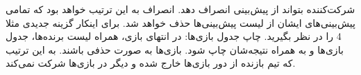 \documentclass[../main.tex]{subfiles}
\begin{document}

     شرکت‌کننده بتواند از پیش‌بینی انصراف دهد. انصراف به این ترتیب خواهد بود که تمامی پیش‌بینی‌های ایشان از لیست پیش‌بینی‌ها حذف خواهد شد. برای اینکار گزینه جدیدی مثلا 4 را در نظر بگیرید.
     چاپ جدول بازی‌ها: در انتهای بازی، همراه لیست برنده‌ها، جدول بازی‌ها و به همراه نتیجه‌شان چاپ شود.
     بازی‌ها به صورت حذفی باشند. به این ترتیب که تیم بازنده از دور بازی‌ها خارج شده و دیگر در بازی‌ها شرکت نمی‌کند.
\end{document}

